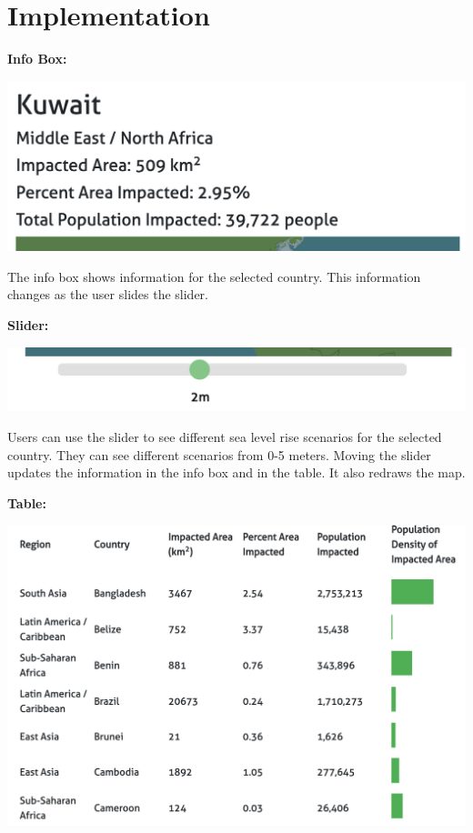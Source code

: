 \documentclass[12pt]{article}
\begin{document}
	\section{Implementation}
		\textbf{Info Box:}
		\newline

		\includegraphics[scale=0.4]{images/infobox.png}
		\newline

		The info box shows information for the selected country.
		This information changes as the user slides the slider.
		\newline

		\textbf{Slider:}
		\newline

		\includegraphics[scale=0.4]{images/slider.png}
		\newline

		Users can use the slider to see different sea level rise scenarios for the selected country.
		They can see different scenarios from 0-5 meters.
		Moving the slider updates the information in the info box and in the table.
		It also redraws the map.
		\newline\newline

		\textbf{Table:}
		\newline

		\includegraphics[scale=0.35]{images/table.png}
		\newline
\end{document}
